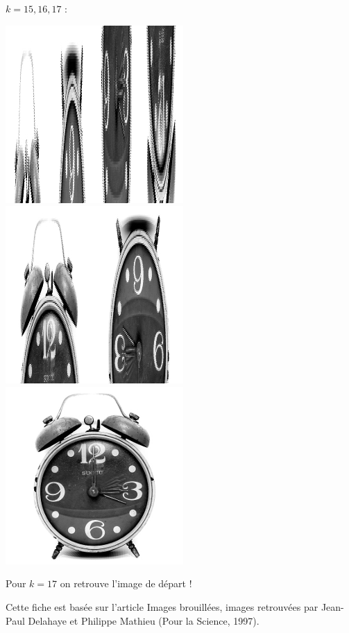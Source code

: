 \documentclass[11pt,class=report,crop=false]{standalone}
\begin{document}
\begin{activite}
$k=15,16,17$ :
\begin{center}
\includegraphics[scale=0.4]{images_fiche/reveil_gimp_new_boul_15.png}\qquad
\includegraphics[scale=0.4]{images_fiche/reveil_gimp_new_boul_16.png}\qquad
\includegraphics[scale=0.4]{images_fiche/reveil_gimp_new_boul_17.png}
\end{center}

Pour $k=17$ on retrouve l'image de départ !

\end{activite}


Cette fiche est basée sur l'article \og{}Images brouillées, images retrouvées\fg{} par Jean-Paul Delahaye et Philippe Mathieu (Pour la Science, 1997).
\end{document}
